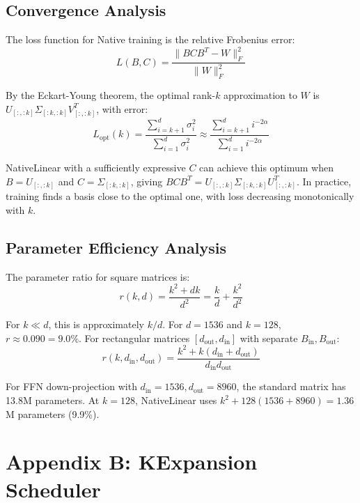 \documentclass[11pt]{article}
\begin{document}
\subsection{Convergence Analysis}

The loss function for Native training is the relative Frobenius error:
\begin{equation}
L(B, C) = \frac{\|B C B^T - W\|_F^2}{\|W\|_F^2}
\end{equation}

By the Eckart-Young theorem, the optimal rank-$k$ approximation to $W$ is $U_{[:,:k]} \Sigma_{[:k,:k]} V_{[:,:k]}^T$, with error:
\begin{equation}
L_{\mathrm{opt}}(k) = \frac{\sum_{i=k+1}^d \sigma_i^2}{\sum_{i=1}^d \sigma_i^2} \approx \frac{\sum_{i=k+1}^d i^{-2\alpha}}{\sum_{i=1}^d i^{-2\alpha}}
\end{equation}

NativeLinear with a sufficiently expressive $C$ can achieve this optimum when $B = U_{[:,:k]}$ and $C = \Sigma_{[:k,:k]}$, giving $BCB^T = U_{[:,:k]} \Sigma_{[:k,:k]} U_{[:,:k]}^T$. In practice, training finds a basis close to the optimal one, with loss decreasing monotonically with $k$.

\subsection{Parameter Efficiency Analysis}

The parameter ratio for square matrices is:
\begin{equation}
r(k, d) = \frac{k^2 + dk}{d^2} = \frac{k}{d} + \frac{k^2}{d^2}
\end{equation}

For $k \ll d$, this is approximately $k/d$. For $d=1536$ and $k=128$, $r \approx 0.090 = 9.0\%$. For rectangular matrices $[d_{\mathrm{out}}, d_{\mathrm{in}}]$ with separate $B_{\mathrm{in}}, B_{\mathrm{out}}$:
\begin{equation}
r(k, d_{\mathrm{in}}, d_{\mathrm{out}}) = \frac{k^2 + k(d_{\mathrm{in}} + d_{\mathrm{out}})}{d_{\mathrm{in}} d_{\mathrm{out}}}
\end{equation}

For FFN down-projection with $d_{\mathrm{in}}=1536, d_{\mathrm{out}}=8960$, the standard matrix has 13.8M parameters. At $k=128$, NativeLinear uses $k^2 + 128(1536+8960) = 1.36$M parameters (9.9\%).


\section{Appendix B: KExpansion Scheduler}
\end{document}
